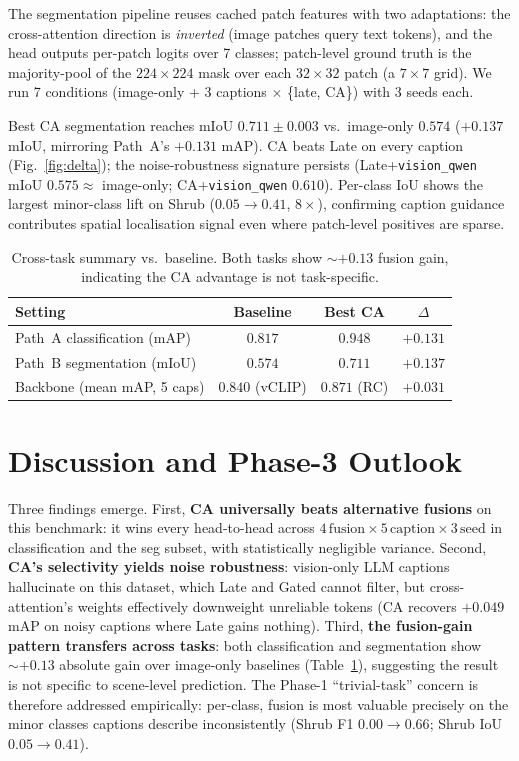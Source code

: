 \documentclass[conference]{IEEEtran}
\begin{document}
The segmentation pipeline reuses cached patch features with two adaptations: the cross-attention direction is \emph{inverted} (image patches query text tokens), and the head outputs per-patch logits over 7 classes; patch-level ground truth is the majority-pool of the $224{\times}224$ mask over each $32{\times}32$ patch (a $7{\times}7$ grid). We run 7 conditions (image-only + 3 captions $\times$ \{late, CA\}) with 3 seeds each.

Best CA segmentation reaches mIoU $0.711 \pm 0.003$ vs.\ image-only $0.574$ ($+0.137$ mIoU, mirroring Path~A's $+0.131$ mAP). CA beats Late on every caption (Fig.~\ref{fig:delta}); the noise-robustness signature persists (Late+\texttt{vision\_qwen} mIoU $0.575 \approx$ image-only; CA+\texttt{vision\_qwen} $0.610$). Per-class IoU shows the largest minor-class lift on Shrub ($0.05\to0.41$, $8\times$), confirming caption guidance contributes spatial localisation signal even where patch-level positives are sparse.

\begin{table}[t]
\centering
\caption{\footnotesize Cross-task summary vs.\ baseline. Both tasks show $\sim{+}0.13$ fusion gain, indicating the CA advantage is not task-specific.}
\label{tab:summary}
\footnotesize
\setlength{\tabcolsep}{4pt}
\renewcommand{\arraystretch}{0.95}
\begin{tabular}{lccc}
\toprule
Setting & Baseline & Best CA & $\Delta$ \\
\midrule
Path~A classification (mAP)              & $0.817$        & $\mathbf{0.948}$ & $+0.131$ \\
Path~B segmentation (mIoU)               & $0.574$        & $\mathbf{0.711}$ & $+0.137$ \\
Backbone (mean mAP, 5 caps)              & $0.840$ (vCLIP)& $0.871$ (RC)     & $+0.031$ \\
\bottomrule
\end{tabular}
\end{table}

\section{Discussion and Phase-3 Outlook}

Three findings emerge. First, \textbf{CA universally beats alternative fusions} on this benchmark: it wins every head-to-head across $4\,\text{fusion}\times 5\,\text{caption}\times 3\,\text{seed}$ in classification and the seg subset, with statistically negligible variance. Second, \textbf{CA's selectivity yields noise robustness}: vision-only LLM captions hallucinate on this dataset, which Late and Gated cannot filter, but cross-attention's weights effectively downweight unreliable tokens (CA recovers $+0.049$ mAP on noisy captions where Late gains nothing). Third, \textbf{the fusion-gain pattern transfers across tasks}: both classification and segmentation show $\sim{+}0.13$ absolute gain over image-only baselines (Table~\ref{tab:summary}), suggesting the result is not specific to scene-level prediction. The Phase-1 ``trivial-task'' concern is therefore addressed empirically: per-class, fusion is most valuable precisely on the minor classes captions describe inconsistently (Shrub F1 $0.00\to0.66$; Shrub IoU $0.05\to0.41$).
\end{document}
